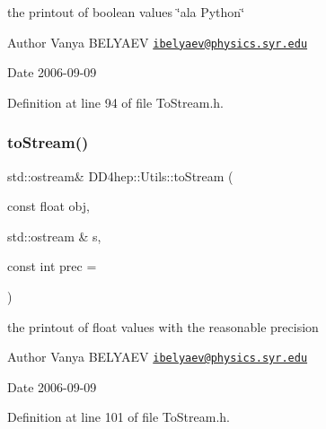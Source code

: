 the printout of boolean values \char`\"{}a\textquotesingle{}la Python\char`\"{} 

\begin{DoxyAuthor}{Author}
Vanya B\+E\+L\+Y\+A\+EV \href{mailto:ibelyaev@physics.syr.edu}{\tt ibelyaev@physics.\+syr.\+edu} 
\end{DoxyAuthor}
\begin{DoxyDate}{Date}
2006-\/09-\/09 
\end{DoxyDate}


Definition at line 94 of file To\+Stream.\+h.

\hypertarget{namespace_d_d4hep_1_1_utils_af0a209fec5d19539ace63d69570c70b7}{}\label{namespace_d_d4hep_1_1_utils_af0a209fec5d19539ace63d69570c70b7} 
\subsubsection{\texorpdfstring{to\+Stream()}{toStream()}\hspace{0.1cm}{\footnotesize\ttfamily [5/22]}}
{\footnotesize\ttfamily std\+::ostream\& D\+D4hep\+::\+Utils\+::to\+Stream (\begin{DoxyParamCaption}\item[{const float}]{obj,  }\item[{std\+::ostream \&}]{s,  }\item[{const int}]{prec = {} }\end{DoxyParamCaption})\hspace{0.3cm}{\ttfamily [inline]}}



the printout of float values with the reasonable precision 

\begin{DoxyAuthor}{Author}
Vanya B\+E\+L\+Y\+A\+EV \href{mailto:ibelyaev@physics.syr.edu}{\tt ibelyaev@physics.\+syr.\+edu} 
\end{DoxyAuthor}
\begin{DoxyDate}{Date}
2006-\/09-\/09 
\end{DoxyDate}


Definition at line 101 of file To\+Stream.\+h.

\hypertarget{namespace_d_d4hep_1_1_utils_a63ebaf591a7f6deb9f4f5d9984e3b745}{}\label{namespace_d_d4hep_1_1_utils_a63ebaf591a7f6deb9f4f5d9984e3b745} 

